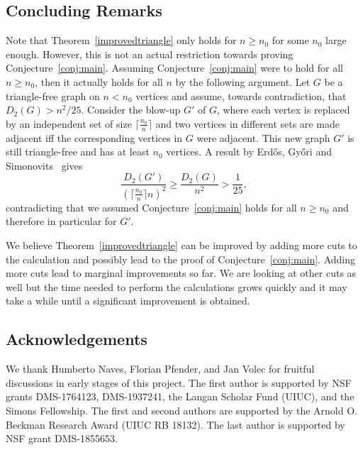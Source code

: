 \documentclass{svproc}
\begin{document}
\subsection{Concluding Remarks}
Note that Theorem~\ref{improvedtriangle} only holds for $n\geq n_0$ for some $n_0$ large enough. However, this is not an actual restriction towards proving Conjecture~\ref{conj:main}. Assuming Conjecture~\ref{conj:main} were to hold for all $n\geq n_0$, then it actually holds for all $n$ by the following argument. Let $G$ be a triangle-free graph on $n <n_0$ vertices and assume, towards contradiction, that $D_2(G)>n^2/25$. Consider the blow-up $G'$ of $G$, where each vertex is replaced by an independent set of size $\lceil \frac{n_0}{n}\rceil$ and two vertices in different sets are made adjacent iff the corresponding vertices in $G$ were adjacent. This new graph $G'$ is still triangle-free and has at least $n_0$ vertices. A result by Erd\H{o}s, Gy\H{o}ri and Simonovits~\cite[Theorem 7]{Howmany} gives 
\begin{equation}
    \frac{D_2(G')}{\left(\lceil \frac{n_0}{n}\rceil n\right)^2}\geq \frac{D_2(G)}{n^2} >\frac{1}{25},
\end{equation}
contradicting that we assumed Conjecture~\ref{conj:main} holds for all $n\geq n_0$ and therefore in particular for $G'$. 


We believe Theorem~\ref{improvedtriangle} can be improved by adding more cuts to the calculation and possibly lead to the proof of Conjecture~\ref{conj:main}. Adding more cuts lead to marginal improvements so far. We are looking at other cuts as well but the time needed to perform the calculations grows quickly and it may take a while until a significant improvement is obtained. 

\subsection{Acknowledgements}
We thank Humberto Naves, Florian Pfender, and Jan Volec for fruitful discussions in early stages of this project. 
The first author is supported by NSF grants DMS-1764123, DMS-1937241, the Langan Scholar Fund (UIUC), and the Simons Fellowship. The first and second authors are supported by the Arnold O. Beckman Research
Award (UIUC RB 18132).
The last author is supported by NSF grant DMS-1855653.





\end{document}
